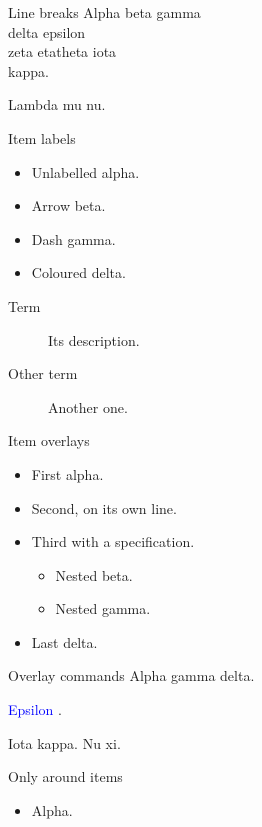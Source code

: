 \documentclass{beamer}
\begin{document}
\begin{frame}{Line breaks}
Alpha beta gamma \\
delta epsilon\\[4pt]
zeta eta\newline theta iota \\
kappa.

Lambda mu nu.
\end{frame}

\begin{frame}{Item labels}
\begin{itemize}
  \item[] Unlabelled alpha.
  \item[$\to$] Arrow beta.
  \item[--] Dash gamma.
  \item[\textcolor{red}{A:}] Coloured delta.
\end{itemize}
\begin{description}
  \item[Term] Its description.
  \item[Other term] Another one.
\end{description}
\end{frame}

\begin{frame}{Item overlays}
\begin{itemize}[<+->]
  \item First alpha.
  \item
    Second, on its own line.
  \item<3-> Third with a specification.
  \begin{itemize}
    \item Nested beta.
    \item Nested gamma.
  \end{itemize}
  \pause
  \item Last delta.
\end{itemize}
\end{frame}

\begin{frame}{Overlay commands}
Alpha  \alert<3>{gamma} \alert<1>{delta}.

\textcolor<2->{blue}{Epsilon}  .

Iota kappa.
\pause
Nu xi.
\end{frame}

\begin{frame}{Only around items}
\begin{itemize}
  \item Alpha.
\end{itemize}
\end{frame}
\end{document}
